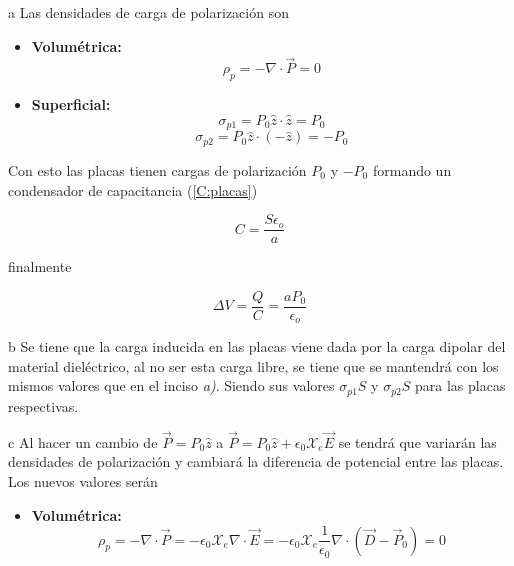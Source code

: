 \begin{solucion}{5}
\ics a Las densidades de carga de polarización son

    \begin{itemize}
        \item \textbf{Volumétrica:}
        \[\rho_p = -\nabla\cdot\Vec{P}=0\]
        \item \textbf{Superficial:}
        \[\sigma_{p1} = P_0\hat{z}\cdot\hat{z}=P_0\]
        \[\sigma_{p2} = P_0\hat{z}\cdot(-\hat{z})=-P_0\]
    \end{itemize}

Con esto las placas tienen cargas de polarización $P_0$ y $-P_0$ formando un condensador de capacitancia (\ref{C:placas})

\[C = \frac{S\epsilon_o}{a}\]

finalmente

\[\Delta V=\frac{Q}{C}=\frac{aP_0}{\epsilon_o}\]

\ics b
Se tiene que la carga inducida en las placas viene dada por la carga dipolar del material dieléctrico, al no ser esta carga libre, se tiene que se mantendrá con los mismos valores que en el inciso \textit{a)}. Siendo sus valores $\sigma_{p1}S$ y $\sigma_{p2}S$ para las placas respectivas. 

    
\ics c 
Al hacer un cambio de $\Vec{P} = P_0\hat{z}$ a $\Vec{P} = P_0\hat{z} + \epsilon_0 \mathcal{X}_e\Vec{E}$ se tendrá que variarán las densidades de polarización y cambiará la diferencia de potencial entre las placas.\\

 Los nuevos valores serán

    \begin{itemize}
        \item \textbf{Volumétrica:}
        \[\rho_p = -\nabla\cdot\Vec{P}= -\epsilon_0\mathcal{X}_e\nabla\cdot\Vec{E}=
        -\epsilon_0\mathcal{X}_e\frac{1}{\epsilon_0}\nabla\cdot\left(\Vec{D}-\Vec{P}_0\right)=0\]
    \end{itemize}


\end{solucion}
